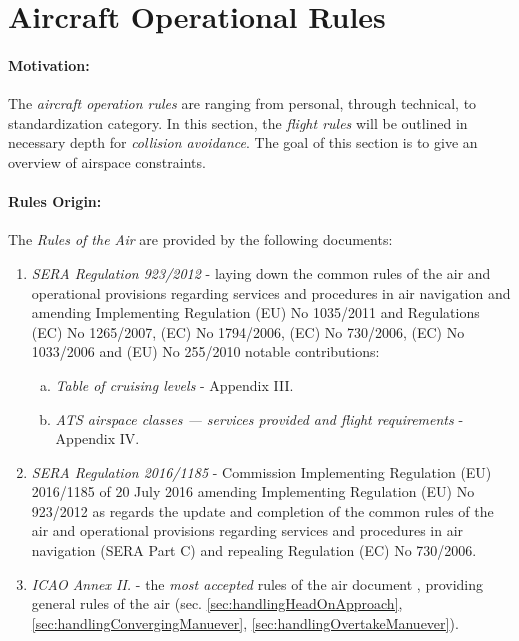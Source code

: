 \newpage
\section{Aircraft Operational Rules}\label{sec:AircraftOperationRules}
\paragraph{Motivation:} The \emph{aircraft operation rules} are ranging from personal, through technical, to standardization category. In this section, the \emph{flight rules} will be outlined in necessary depth for \emph{collision avoidance}. The goal of this section is to give an overview of airspace constraints. 

\paragraph{Rules Origin:} The \emph{Rules of the Air} are provided by the following documents:

\begin{enumerate}
    \item \emph{SERA Regulation 923/2012} - laying down the common rules of the air and operational provisions regarding services and procedures in air navigation and amending Implementing Regulation (EU) No 1035/2011 and Regulations (EC) No 1265/2007, (EC) No 1794/2006, (EC) No 730/2006, (EC) No 1033/2006 and (EU) No 255/2010 \cite{rulesOfTheFlight2012} notable contributions:
    \begin{enumerate}[a.]
        \item \emph{Table of cruising levels} - Appendix III.
        \item \emph{ATS airspace classes — services provided and flight requirements} - Appendix IV.
    \end{enumerate}
    
    \item \emph{SERA Regulation 2016/1185} - Commission Implementing Regulation (EU) 2016/1185 of 20 July 2016 amending Implementing Regulation (EU) No 923/2012 as regards the update and completion of the common rules of the air and operational provisions regarding services and procedures in air navigation (SERA Part C) and repealing Regulation (EC) No 730/2006.

    \item \emph{ICAO  Annex II.} - the \emph{most accepted} rules of the air document \cite{icaoAnnex2}, providing general rules of the air (sec. \ref{sec:handlingHeadOnApproach}, \ref{sec:handlingConvergingManuever}, \ref{sec:handlingOvertakeManuever}).
\end{enumerate}

